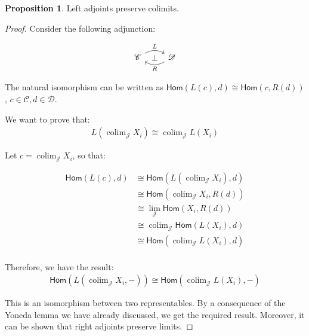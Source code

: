 \documentclass[10pt]{amsart}
\newcommand{\8}{\ensuremath{\infty}}
\newcommand{\0}{\ensuremath{\overset{\rightarrow}{0}}}
\newcommand{\1}{\ensuremath{\mathbf{1}}}
\newcommand{\C}{\ensuremath{\mathscr{C}}}
\newcommand{\D}{\ensuremath{\mathscr{D}}}
\newcommand{\J}{\ensuremath{\mathscr{J}}}
\newcommand{\Hom}{\ensuremath{\mathsf{Hom}}}
\DeclareMathOperator*{\colim}{colim}
\theoremstyle{definition}
\newtheorem{proposition}[definition]{Proposition}
\numberwithin{definition}{subsection}
\numberwithin{definition}{section}
\begin{document}
\begin{proposition}
  Left adjoints preserve colimits.
\end{proposition}

\begin{proof}
  Consider the following adjunction:

  \begin{equation*}
    \begin{tikzcd}
      \C \arrow[r, bend left, "L"] \arrow[r, phantom, "\bot" description] & \D \arrow[l, bend left, "R"]
    \end{tikzcd}
  \end{equation*}

  The natural isomorphism can be written as $\Hom(L(c), d) \cong \Hom(c, R(d))$, $c \in \C, d \in \D$.

  We want to prove that:
  \begin{align*}
    L(\colim_\J X_i) \cong \colim_\J L(X_i)
  \end{align*}

  Let $c = \colim_\J X_i$, so that:

  \begin{align*}
    \Hom(L(c), d) & \cong \Hom(L(\colim_\J X_i), d) \\
                  & \cong \Hom(\colim_\J X_i, R(d)) \\
                  & \cong \lim_\J \Hom(X_i, R(d))   \\
                  & \cong \colim_\J \Hom(L(X_i), d) \\
                  & \cong \Hom(\colim_\J L(X_i), d) \\
  \end{align*}

  Therefore, we have the result:
  \begin{align*}
    \Hom(L(\colim_\J X_i, -)) \cong \Hom(\colim_\J L(X_i), -)
  \end{align*}

  This is an isomorphism between two representables. By a consequence of the Yoneda lemma we have already discussed, we get the required result. Moreover, it can be shown that right adjoints preserve limits.
\end{proof}
\end{document}
